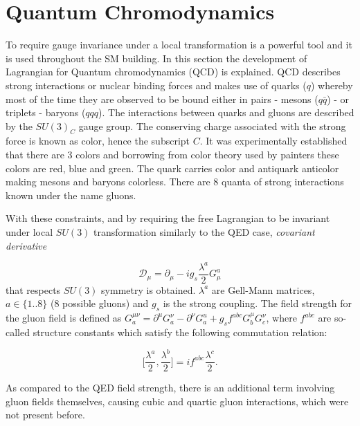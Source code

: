 \section{Quantum Chromodynamics}
\label{qcd}
To require gauge invariance under a local transformation is a powerful tool and it is used throughout the \gls{SM} building. In this section the development of Lagrangian for Quantum chromodynamics (\gls{QCD}) is explained. \gls{QCD} describes strong interactions or nuclear binding forces and makes use of quarks ($q$) whereby most of the time they are observed to be bound either in pairs - mesons ($q\bar{q}$) - or triplets - baryons ($qqq$). The interactions between quarks and gluons are described by the $SU(3)_{C}$ gauge group. The conserving charge associated with the strong force is known as color, hence the subscript $C$. It was experimentally established that there are 3 colors and borrowing from color theory used by painters these colors are red, blue and green. The quark carries color and antiquark anticolor making mesons and baryons colorless. There are 8 quanta of strong interactions known under the name gluons.

With these constraints, and by requiring the free Lagrangian to be invariant under local $SU(3)$ transformation similarly to the \gls{QED} case, \textit{covariant derivative}

\begin{equation}
\mathcal{D}_{\mu} = \partial_{\mu} - ig_{s}\frac{\lambda^{a}}{2}G^{a}_{\mu}
\end{equation}
 that respects $SU(3)$ symmetry is obtained. $\lambda^{a}$ are Gell-Mann matrices, $a\in\{1..8\}$ (8 possible gluons) and $g_{s}$ is the strong coupling. The field strength for the gluon field is defined as $G_{a}^{\mu\nu}=\partial^{u}G_{a}^{\nu} - \partial^{\nu}G_{a}^{u} + g_{s}f^{abc}G_{b}^{\mu}G_{c}^{\nu}$, where $f^{abc}$ are so-called structure constants which satisfy the following commutation relation:

\begin{equation}
	\Big[\frac{\lambda^{a}}{2},\frac{\lambda^{b}}{2}\Big] = if^{abc}\frac{\lambda^{c}}{2}.
\end{equation}

As compared to the \gls{QED} field strength, there is an additional term involving gluon fields themselves, causing cubic and quartic gluon interactions, which were not present before.

